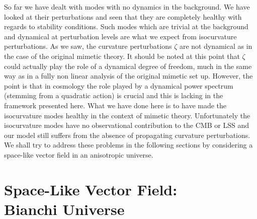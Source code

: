 \documentclass[%
 reprint,
 amsmath,amssymb,
 aps,
]{revtex4-1}
\begin{document}
So far we have  dealt with modes with no dynamics in the background. We have looked at their perturbations and seen that they are completely healthy with regards to stability conditions. Such modes which are trivial at the background and dynamical at perturbation levels are what we expect from isocurvature perturbations. As we saw, the curvature perturbations $\zeta$ are not dynamical as in the case of the original mimetic theory. It should be noted at this point  that $\zeta$  could actually play the role of a dynamical degree of freedom,  much in the same way as in a fully non linear analysis of the original mimetic set up. However, the point is that in cosmology the role played by a dynamical power spectrum (stemming from a quadratic action) is crucial and this is lacking in the framework presented here. What we have done here is to have made the  isocurvature modes  healthy in the context of mimetic theory. Unfortunately the isocurvature modes have no observational contribution to the CMB or LSS and our model still suffers from the absence of propagating curvature perturbations. We shall try to address these problems in the following sections by considering a space-like vector field in an anisotropic universe.

\section{Space-Like Vector Field:\\Bianchi Universe}
\end{document}
